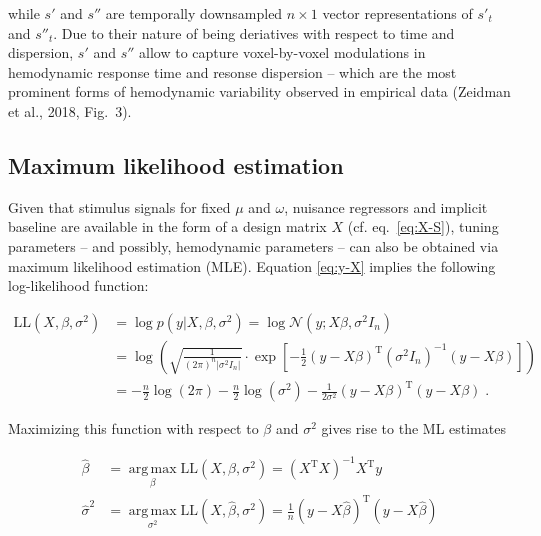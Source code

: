 \documentclass[a4paper,12pt]{article}
\begin{document}
while $s'$ and $s''$ are temporally downsampled $n \times 1$ vector representations of $s'_t$ and $s''_t$. Due to their nature of being deriatives with respect to time and dispersion, $s'$ and $s''$ allow to capture voxel-by-voxel modulations in hemodynamic response time and resonse dispersion -- which are the most prominent forms of hemodynamic variability observed in empirical data (Zeidman et al., 2018, Fig.~3).


\subsection{Maximum likelihood estimation}

Given that stimulus signals for fixed $\mu$ and $\omega$, nuisance regressors and implicit baseline are available in the form of a design matrix $X$ (cf. eq.~\ref{eq:X-S}), tuning parameters -- and possibly, hemodynamic parameters -- can also be obtained via maximum likelihood estimation (MLE). Equation \eqref{eq:y-X} implies the following log-likelihood function:

\begin{equation} \label{eq:LLF}
\begin{split}
\mathrm{LL}(X,\beta,\sigma^2) &= \log p(y|X,\beta,\sigma^2) = \log \mathcal{N}(y; X\beta, \sigma^2 I_n) \\
&= \log \left( \sqrt{\frac{1}{(2\pi)^n |\sigma^2 I_n|}} \cdot \exp\left[ -\frac{1}{2} (y - X\beta)^\mathrm{T} (\sigma^2 I_n)^{-1} (y - X\beta) \right] \right) \\
&= - \frac{n}{2} \log(2\pi) - \frac{n}{2} \log (\sigma^2) - \frac{1}{2 \sigma^2} (y - X\beta)^\mathrm{T} (y - X\beta) \; .
\end{split}
\end{equation}

Maximizing this function with respect to $\beta$ and $\sigma^2$ gives rise to the ML estimates

\vspace{-0.5em}
\begin{equation} \label{eq:MLE}
\begin{split}
\hat{\beta} &= \operatorname*{arg\,max}_{\beta} \mathrm{LL}(X,\beta,\sigma^2) = (X^\mathrm{T} X)^{-1} X^\mathrm{T} y \\
\hat{\sigma}^2 &= \operatorname*{arg\,max}_{\sigma^2} \mathrm{LL}(X,\hat{\beta},\sigma^2) = \frac{1}{n} (y-X\hat{\beta})^\mathrm{T} (y-X\hat{\beta})
\end{split}
\end{equation}
\end{document}
